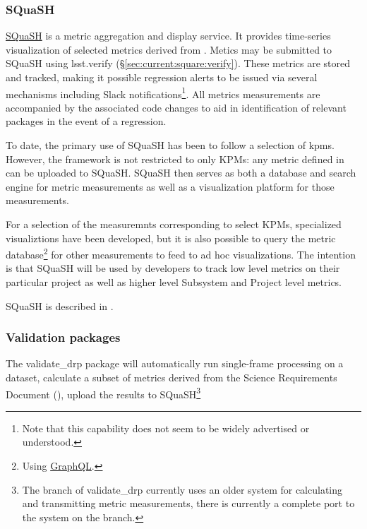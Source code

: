 \documentclass[DM,authoryear,toc,lsstdraft]{lsstdoc}
\begin{document}
\subsubsection{SQuaSH}
\label{sec:current:square:squash}

\href{https://squash.lsst.codes}{SQuaSH} is a \gls{metric} aggregation and
display service. It provides time-series visualization of selected metrics
derived from . Metics may be submitted to SQuaSH using
lsst.verify (\S\ref{sec:current:square:verify}). These metrics are stored and
tracked, making it possible regression alerts to be issued via several
mechanisms including Slack notifications\footnote{Note that this capability
does not seem to be widely advertised or understood.}. All metrics
measurements are accompanied by the associated code changes to aid in
identification of relevant packages in the event of a regression.

To date, the primary use of SQuaSH has been to follow a selection of
\glspl{kpm}.  However, the framework is not restricted to only KPMs: any
metric defined in  can be uploaded to SQuaSH. SQuaSH
then serves as both a database and search engine for metric measurements as
well as a visualization platform for those measurements.

For a selection of the measuremnts corresponding to select KPMs, specialized
visualiztions have been developed, but it is also possible to query the metric
database\footnote{Using \href{http://graphql.org}{GraphQL}.} for other
measurements to feed to ad hoc visualizations. The intention is that SQuaSH
will be used by developers to track low level metrics on their particular
project as well as higher level Subsystem and Project level metrics.

SQuaSH is described in .

\subsubsection{Validation packages}
\label{sec:current:square:validate}


The validate\_drp package will automatically run single-frame processing on a
dataset, calculate a subset of \glspl{metric} derived from the Science
Requirements Document (), upload the results to
SQuaSH\footnote{The  branch of validate\_drp currently uses an
older system for calculating and transmitting \gls{metric} measurements, there
is currently a complete port to the  system on the
 branch.}
\end{document}
